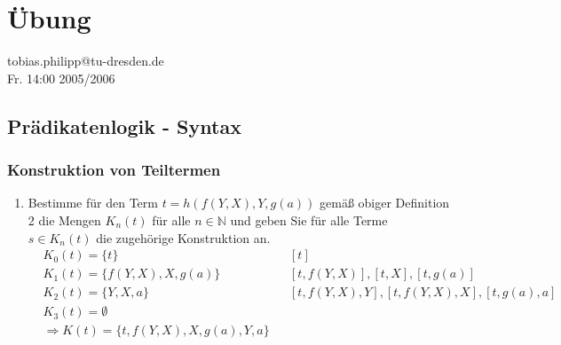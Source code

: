 
\chapter{Übung}
tobias.philipp@tu-dresden.de\\ Fr. 14:00 2005/2006
\section{Prädikatenlogik - Syntax}
\subsection{Konstruktion von Teiltermen}
\begin{enumerate}
	\item Bestimme für den Term \( t = h(f(Y,X),Y,g(a)) \) gemäß obiger Definition 2 die Mengen \(K_{n}(t)\) für alle \(n \in \mathbb{N} \)  und geben Sie für alle Terme \(s\in K_{n}(t)\) die zugehörige Konstruktion an.
	\begin{align*}
	&K_{0}(t) = \{t\}&&[t]\\
	&K_{1}(t) = \{f(Y,X),X,g(a)\}&&[t,f(Y,X)],[t,X],[t,g(a)]\\
	&K_{2}(t) = \{Y,X,a\}&&[t,f(Y,X),Y],                          [t,f(Y,X),X],[t,g(a),a]\\
	&K_{3}(t) = \emptyset\\
	&\Rightarrow K(t) = \{t,f(Y,X),X,g(a),Y,a\}
	\end{align*}			


\end{enumerate}
